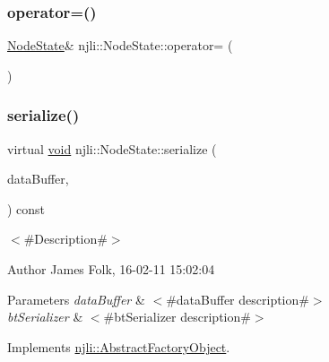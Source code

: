 \subsubsection{\texorpdfstring{operator=()}{operator=()}}
{\footnotesize\ttfamily \mbox{\hyperlink{classnjli_1_1_node_state}{Node\+State}}\& njli\+::\+Node\+State\+::operator= (\begin{DoxyParamCaption}\item[{const \mbox{\hyperlink{classnjli_1_1_node_state}{Node\+State}} \&}]{ }\end{DoxyParamCaption})\hspace{0.3cm}{\ttfamily [protected]}}

\mbox{\label{classnjli_1_1_node_state_a6383632da2585bd7da2c12216df1f18a}} 
\subsubsection{\texorpdfstring{serialize()}{serialize()}}
{\footnotesize\ttfamily virtual \mbox{\hyperlink{_thread_8h_af1e856da2e658414cb2456cb6f7ebc66}{void}} njli\+::\+Node\+State\+::serialize (\begin{DoxyParamCaption}\item[{\mbox{\hyperlink{_thread_8h_af1e856da2e658414cb2456cb6f7ebc66}{void}} $\ast$}]{data\+Buffer,  }\item[{bt\+Serializer $\ast$}]{ }\end{DoxyParamCaption}) const\hspace{0.3cm}{\ttfamily [virtual]}}



$<$\#\+Description\#$>$ 

\begin{DoxyAuthor}{Author}
James Folk, 16-\/02-\/11 15\+:02\+:04
\end{DoxyAuthor}

\begin{DoxyParams}{Parameters}
{\em data\+Buffer} & $<$\#data\+Buffer description\#$>$ \\
\hline
{\em bt\+Serializer} & $<$\#bt\+Serializer description\#$>$ \\
\hline
\end{DoxyParams}


Implements \mbox{\hyperlink{classnjli_1_1_abstract_factory_object_aad2fbe86fb3bdecf02918a96b9c57976}{njli\+::\+Abstract\+Factory\+Object}}.

